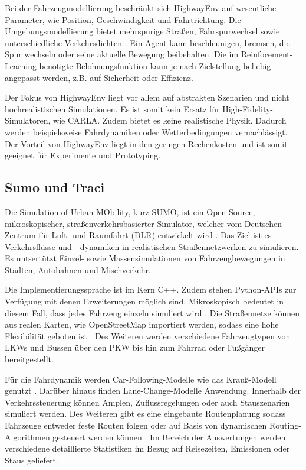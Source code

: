 Bei der Fahrzeugmodellierung beschränkt sich HighwayEnv auf wesentliche Parameter, wie Position, Geschwindigkeit und Fahrtrichtung. Die Umgebungsmodellierung bietet mehrspurige Straßen, Fahrspurwechsel sowie unterschiedliche Verkehrsdichten \cite{highway-env}. Ein Agent kann beschleunigen, bremsen, die Spur wechseln oder seine aktuelle Bewegung beibehalten. Die im Reinfocement-Learning benötigte Belohnungsfunktion kann je nach Zielstellung beliebig angepasst werden, z.B. auf Sicherheit oder Effizienz. 

Der Fokus von HighwayEnv liegt vor allem auf abstrakten Szenarien und nicht hochrealistischen Simulationen. Es ist somit kein Ersatz für High-Fidelity-Simulatoren, wie CARLA. Zudem bietet es keine realistische Physik. Dadurch werden beispielsweise Fahrdynamiken oder Wetterbedingungen vernachlässigt. Der Vorteil von HighwayEnv liegt in den geringen Rechenkosten und ist somit geeignet für Experimente und Prototyping.
\subsection{Sumo und Traci}
Die Simulation of Urban MObility, kurz SUMO, ist ein Open-Source, mikroskopischer, straßenverkehrsbasierter Simulator, welcher vom Deutschen Zentrum für Luft- und Raumfahrt (DLR) entwickelt wird \cite{SUMO2018}. Das Ziel ist es Verkehrsflüsse und - dynamiken in realistischen Straßennetzwerken zu simulieren. Es untsertützt Einzel- sowie Massensimulationen von Fahrzeugbewegungen in Städten, Autobahnen und Mischverkehr.

Die Implementierungssprache ist im Kern C++. Zudem stehen Python-APIs zur Verfügung mit denen Erweiterungen möglich sind. Mikroskopisch bedeutet in diesem Fall, dass jedes Fahrzeug einzeln simuliert wird \cite{sumo_at_a_glance}. Die Straßennetze können aus realen Karten, wie OpenStreetMap importiert werden, sodass eine hohe Flexibilität geboten ist \cite{sumo_open_street_map}. Des Weiteren werden verschiedene Fahrzeugtypen von LKWs und Bussen über den PKW bis hin zum Fahrrad oder Fußgänger bereitgestellt.

Für die Fahrdynamik werden Car-Following-Modelle wie das Krauß-Modell genutzt \cite{sumo_car_following}. Darüber hinaus finden Lane-Change-Modelle Anwendung. Innerhalb der Verkehrssteuerung können Amplen, Zuflussregelungen oder auch Stauszenarien simuliert werden. Des Weiteren gibt es eine eingebaute Routenplanung sodass Fahrzeuge entweder feste Routen folgen oder auf Basis von dynamischen Routing-Algorithmen gesteuert werden können \cite{sumo_vehicles}. Im Bereich der Auswertungen werden verschiedene detaillierte Statistiken im Bezug auf Reisezeiten, Emissionen oder Staus geliefert.

